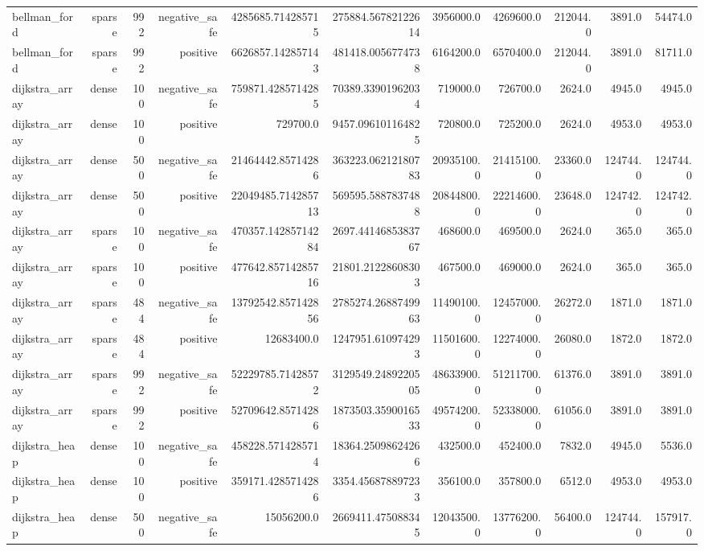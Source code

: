\begin{table}[htbp]
\begin{tabular}{lrrrrrrrrrr}
bellman_ford & sparse & 992 & negative_safe & 4285685.714285715 & 275884.56782122614 & 3956000.0 & 4269600.0 & 212044.0 & 3891.0 & 54474.0 \\
bellman_ford & sparse & 992 & positive & 6626857.142857143 & 481418.0056774738 & 6164200.0 & 6570400.0 & 212044.0 & 3891.0 & 81711.0 \\
dijkstra_array & dense & 100 & negative_safe & 759871.4285714285 & 70389.33901962034 & 719000.0 & 726700.0 & 2624.0 & 4945.0 & 4945.0 \\
dijkstra_array & dense & 100 & positive & 729700.0 & 9457.096101164825 & 720800.0 & 725200.0 & 2624.0 & 4953.0 & 4953.0 \\
dijkstra_array & dense & 500 & negative_safe & 21464442.85714286 & 363223.06212180783 & 20935100.0 & 21415100.0 & 23360.0 & 124744.0 & 124744.0 \\
dijkstra_array & dense & 500 & positive & 22049485.714285713 & 569595.5887837488 & 20844800.0 & 22214600.0 & 23648.0 & 124742.0 & 124742.0 \\
dijkstra_array & sparse & 100 & negative_safe & 470357.14285714284 & 2697.4414685383767 & 468600.0 & 469500.0 & 2624.0 & 365.0 & 365.0 \\
dijkstra_array & sparse & 100 & positive & 477642.85714285716 & 21801.21228608303 & 467500.0 & 469000.0 & 2624.0 & 365.0 & 365.0 \\
dijkstra_array & sparse & 484 & negative_safe & 13792542.857142856 & 2785274.2688749963 & 11490100.0 & 12457000.0 & 26272.0 & 1871.0 & 1871.0 \\
dijkstra_array & sparse & 484 & positive & 12683400.0 & 1247951.610974293 & 11501600.0 & 12274000.0 & 26080.0 & 1872.0 & 1872.0 \\
dijkstra_array & sparse & 992 & negative_safe & 52229785.71428572 & 3129549.2489220505 & 48633900.0 & 51211700.0 & 61376.0 & 3891.0 & 3891.0 \\
dijkstra_array & sparse & 992 & positive & 52709642.85714286 & 1873503.3590016533 & 49574200.0 & 52338000.0 & 61056.0 & 3891.0 & 3891.0 \\
dijkstra_heap & dense & 100 & negative_safe & 458228.5714285714 & 18364.25098624266 & 432500.0 & 452400.0 & 7832.0 & 4945.0 & 5536.0 \\
dijkstra_heap & dense & 100 & positive & 359171.4285714286 & 3354.456878897233 & 356100.0 & 357800.0 & 6512.0 & 4953.0 & 4953.0 \\
dijkstra_heap & dense & 500 & negative_safe & 15056200.0 & 2669411.475088345 & 12043500.0 & 13776200.0 & 56400.0 & 124744.0 & 157917.0 \\

\end{tabular}
\end{table}

